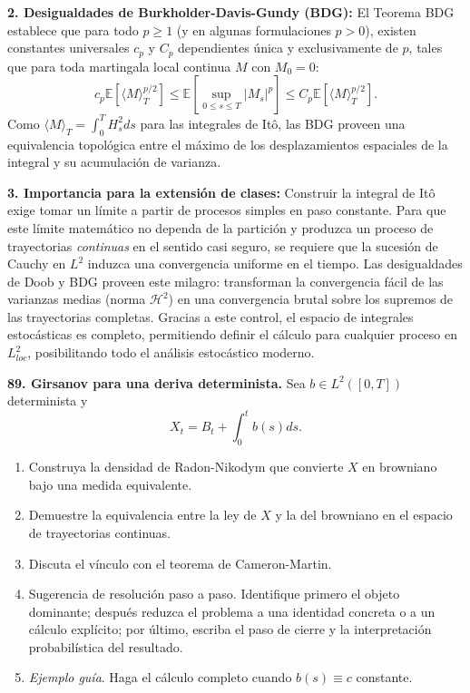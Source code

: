 \documentclass[11pt, letterpaper]{article}
\begin{document}
\begin{solucion}
    \textbf{2. Desigualdades de Burkholder-Davis-Gundy (BDG):}
    El Teorema BDG establece que para todo $p \ge 1$ (y en algunas formulaciones $p>0$), existen constantes universales $c_p$ y $C_p$ dependientes única y exclusivamente de $p$, tales que para toda martingala local continua $M$ con $M_0 = 0$:
    \[ c_p \mathbb{E}\left[ \langle M \rangle_T^{p/2} \right] \le \mathbb{E}\left[ \sup_{0 \le s \le T} |M_s|^p \right] \le C_p \mathbb{E}\left[ \langle M \rangle_T^{p/2} \right]. \]
    Como $\langle M \rangle_T = \int_0^T H_s^2 ds$ para las integrales de Itô, las BDG proveen una equivalencia topológica entre el máximo de los desplazamientos espaciales de la integral y su acumulación de varianza.

    \textbf{3. Importancia para la extensión de clases:}
    Construir la integral de Itô exige tomar un límite a partir de procesos simples en paso constante. Para que este límite matemático no dependa de la partición y produzca un proceso de trayectorias \textit{continuas} en el sentido casi seguro, se requiere que la sucesión de Cauchy en $L^2$ induzca una convergencia uniforme en el tiempo.
    Las desigualdades de Doob y BDG proveen este milagro: transforman la convergencia fácil de las varianzas medias (norma $\mathcal{H}^2$) en una convergencia brutal sobre los supremos de las trayectorias completas. Gracias a este control, el espacio de integrales estocásticas es completo, permitiendo definir el cálculo para cualquier proceso en $L_{loc}^2$, posibilitando todo el análisis estocástico moderno.
\end{solucion}

\newpage

\begin{ejercicio}
    \textbf{89. Girsanov para una deriva determinista.} Sea $b\in L^{2}([0,T])$ determinista y
    \[ X_{t} = B_{t} + \int_{0}^{t} b(s) ds. \]
    \begin{enumerate}
        \item Construya la densidad de Radon-Nikodym que convierte $X$ en browniano bajo una medida equivalente.
        \item Demuestre la equivalencia entre la ley de $X$ y la del browniano en el espacio de trayectorias continuas.
        \item Discuta el vínculo con el teorema de Cameron-Martin.
        \item Sugerencia de resolución paso a paso. Identifique primero el objeto dominante; después reduzca el problema a una identidad concreta o a un cálculo explícito; por último, escriba el paso de cierre y la interpretación probabilística del resultado.
        \item \textit{Ejemplo guía}. Haga el cálculo completo cuando $b(s)\equiv c$ constante.
    \end{enumerate}
\end{ejercicio}
\end{document}
